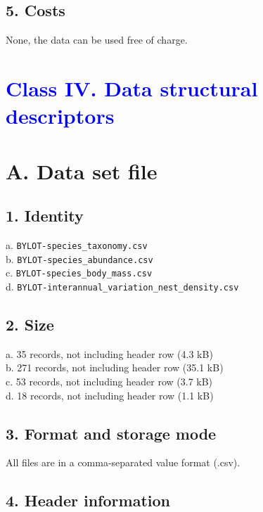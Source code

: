\documentclass[a4paper,twoside,12pt]{article}
\begin{document}
                \subsection*{5. Costs}
                None, the data can be used free of charge.          
\newpage
    
 \section*{\textcolor{Blue}{Class IV. Data structural descriptors}}
    \section*{A. Data set file}
                        \subsection*{1. Identity} 
                        a. \texttt{BYLOT-species\_taxonomy.csv}\\
                b. \texttt{BYLOT-species\_abundance.csv}\\
                c. \texttt{BYLOT-species\_body\_mass.csv}\\
                        d. \texttt{BYLOT-interannual\_variation\_nest\_density.csv}\\ 
                        
                        \subsection*{2. Size} 
                        a. 35 records, not including header row (4.3 kB)\\
                        b. 271 records, not including header row  (35.1 kB)\\
                        c. 53 records, not including header row  (3.7 kB)\\
                        d. 18 records, not including header row  (1.1 kB)
                        
                        \subsection*{3. Format and storage mode} All files are in a comma-separated value format (.csv). 
      
                        \subsection*{4. Header information} 
\end{document}
